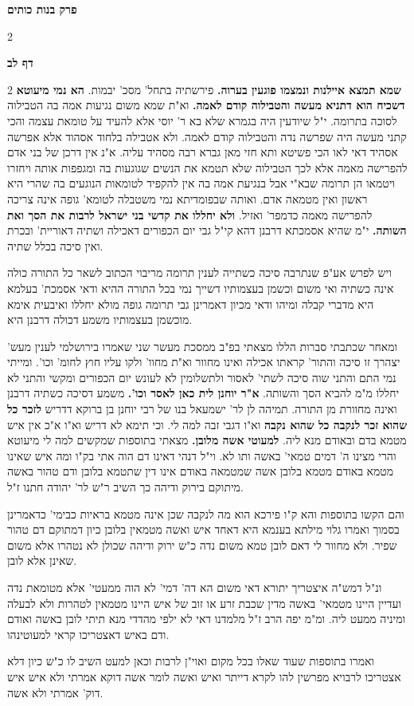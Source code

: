 \documentclass[12pt, openany]{book}
\newcommand{\sethebfont}{
\fontsize{10.5pt}{21.0pt} \selectfont
}
\newcommand{\twocol}[1]{
	{\sethebfont \begin{multicols}{2}
			#1
	\end{multicols}}	
}
\newcommand{\chapname}{}
\newcommand{\sectname}{}
\newcommand{\newchap}[1]{
	\addcontentsline{toc}{chapter}{#1}
	\renewcommand{\chapname}{#1}
		\begin{center}
			\textbf{%
\fontsize{16pt}{16pt}\selectfont
				#1}
		\end{center}
}
\newcommand{\newsection}[1]{
	\renewcommand{\sectname}{#1}	
	\vspace{-\baselineskip}
	\begin{center}
		\textbf{%
\fontsize{16pt}{16pt}\selectfont
			#1}
	\end{center}
	\vspace{-\baselineskip}
	\nopagebreak
}
\begin{document}
\newchap{פרק  בנות כותים}
\twocol{\clearpage}

\newsection{דף לב}
\twocol{\textbf{שמא תמצא איילנות ונמצמו פוגעין בערוה.} פירשתיה בתחל' מסכ' יבמות.
\textbf{הא נמי מיעוטא דשכיח הוא דתניא מעשה והטבילוה קודם לאמה.} וא"ת שמא משום נגיעות אמה בה הטבילוה לסוכה בתרומה. י"ל שיודעין היה בגמרא שלא בא ר' יוסי אלא להעיד על טומאת עצמה והכי קתני מעשה היה שפרשה נדה והטבילוה קודם לאמה. ולא אטבילה בלחוד אסהוד אלא אפרשה אסהיד דאי לאו הכי פשיטא ותא חזי מאן גברא רבה מסהיד עליה. א"נ אין דרכן של בני אדם להפרישה מאמה אלא לכך הטבילוה שלא תטמא את הנשים שגוגעות בה ומגפפות אותה ויחזרו ויטמאו הן תרומה שבא"י אבל בנגיעת אמה בה אין להקפיד לטומאות הנוגעים בה שהרי היא ראשון ואין מטמאה אדם. ואותה שבפומדיתא נמי משטבלה לטומא' גופה אינה צריכה להפרישה מאמה כדמפר' ואזיל. 
\textbf{ולא יחללו את קדשי בני ישראל לרבות את הסך ואת השותה.} י"מ שהיא אסמכתא דרבנן דהא קי"ל גבי יום הכפורים דאכילה ושתיה דאוריית' ובכרת ואין סיכה בכלל שתיה.\par ויש לפרש אע"פ שנתרבה סיכה כשתייה לענין תרומה מריבוי הכתוב לשאר כל התורה כולה אינה כשתיה ואי משום וכשמן בעצמותיו דשייך נמי בכל התורה ההיא ודאי אסמכת' בעלמא היא מדברי קבלה ומיהו ודאי מכיון דאמרינן גבי תרומה גופה מולא יחללו ואיבעית אימא מוכשמן בעצמותיו משמע דכולה דרבנן היא.\par ומאחר שכתבתי סברות הללו מצאתי בפ"ב ממסכת מעשר שני שאמרו בירושלמי לענין מעש' יצהרך זו סיכה והתור' קראתו אכילה ואינו מחוור וא"ת מחוו' ולקו עליו חוץ לחומ' וכו'. ומייתי נמי התם והתני שוה סיכה לשתי' לאסור ולתשלומין לא לעונש יום הכפורים ומקשי והתני לא יחללו מ"מ להביא הסך והשותה. 
\textbf{א"ר יוחנן לית כאן לאסר וכו'.} משמע דסיכה כשתיה דרבנן ואינה מחוורת מן התורה. 
תמיהה לן לר' ישמעאל בנו של רבי יוחנן בן ברוקא דדריש \textbf{לזכר כל שהוא זכר לנקבה כל שהוא נקבה} וא"ו דגבי זבה למה לי. וכי תימא לא דריש וא"ו א"כ אין איש מטמא בדם ובאודם מנא ליה. 
\textbf{למעוטי אשה מלובן.} מצאתי בתוספות שמקשים למה לי מיעוטא והרי מצינו ה' דמים טמאי' באשה ותו לא. וי"ל דנהי דאינו דם הוה אתי בק"ו ומה איש שאינו מטמא באודם מטמא בלובן אשה שמטמאה באודם אינו דין שתטמא בלובן ודם טהור באשה מיתוקם בירוק ודיהה כך השיב ר"ש לר' יהודה חתנו ז"ל.\par והם הקשו בתוספות והא ק"ו פירכא הוא מה לנקבה שכן אינה מטמא בראיות כבימי' כדאמרינן בסמוך ואמרו גלוי מילתא בענמא היא דאחד איש ואשה מטמאין בלובן כיון דמתוקם דם טהור שפיר. ולא מחוור לי דאם לובן טמא משום נדה כ"ש ירוק ודיהה שכולן לא נטהרו אלא משום שאינן אלא לובן.\par ונ"ל דמש"ה איצטריך יתורא דאי משום הא דה' דמי' לא הוה ממעטי' אלא מטומאת נדה ועדיין היינו מטמאי' באשה מדין שכבת זרע או זוב של איש היינו מטמאין לטהרות ולא לבעלה ומיניה ממעט ליה. ומ"מ יפה הרב ז"ל מלמדנו דאי לא ילפי מהדדי מנא תיתי לובן באשה ואודם ודם באיש דאצטריכו קראי למעוטינהו.\par ואמרו בתוספות שעוד שאלו בכל מקום ואוי"ן לרבות וכאן למעט השיב לו כ"ש כיון דלא אצטריכו לרבויא מפרשין להו לקרא דייתר ואיש ואשה לומר אשה דוקא אמרתי ולא איש איש דוק' אמרתי ולא אשה. 
}
\end{document}
